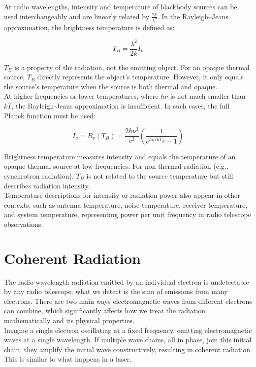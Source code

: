 At radio wavelengths, intensity and temperature of blackbody sources can be used interchangeably and are linearly related by \( \frac{2k}{\lambda^2} \). In the Rayleigh–Jeans approximation, the brightness temperature is defined as:

\[
T_B = \frac{\lambda^2}{2k} I_\nu
\]

\( T_B \) is a property of the radiation, not the emitting object. For an opaque thermal source, \( T_B \) directly represents the object's temperature. However, it only equals the source's temperature when the source is both thermal and opaque. \\

At higher frequencies or lower temperatures, where \( h\nu \) is not much smaller than \( kT \), the Rayleigh-Jeans approximation is insufficient. In such cases, the full Planck function must be used:

\[
I_\nu = B_\nu(T_B) = \frac{2h\nu^3}{c^2} \left( \frac{1}{e^{h\nu/kT_B} - 1} \right)
\]

Brightness temperature measures intensity and equals the temperature of an opaque thermal source at low frequencies. For non-thermal radiation (e.g., synchrotron radiation), \( T_B \) is not related to the source temperature but still describes radiation intensity. \\

Temperature descriptions for intensity or radiation power also appear in other contexts, such as antenna temperature, noise temperature, receiver temperature, and system temperature, representing power per unit frequency in radio telescope observations. \\

\section{Coherent Radiation}

The radio-wavelength radiation emitted by an individual electron is undetectable by any radio telescope; what we detect is the sum of emissions from many electrons. There are two main ways electromagnetic waves from different electrons can combine, which significantly affects how we treat the radiation mathematically and its physical properties. \\

Imagine a single electron oscillating at a fixed frequency, emitting electromagnetic waves at a single wavelength. If multiple wave chains, all in phase, join this initial chain, they amplify the initial wave constructively, resulting in coherent radiation. This is similar to what happens in a laser. \\

